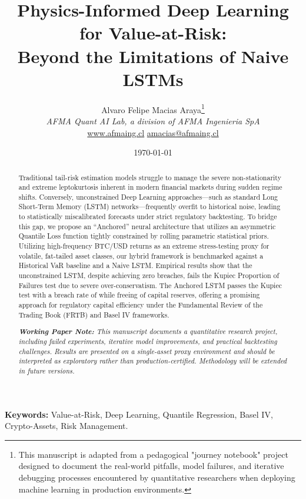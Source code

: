 \documentclass[12pt, a4paper]{article}
\title{\textbf{Physics-Informed Deep Learning for Value-at-Risk:\\ Beyond the Limitations of Naive LSTMs}}
\author{
    Alvaro Felipe Macias Araya\thanks{This manuscript is adapted from a pedagogical "journey notebook" project designed to document the real-world pitfalls, model failures, and iterative debugging processes encountered by quantitative researchers when deploying machine learning in production environments.} \\
    \textit{AFMA Quant AI Lab, a division of AFMA Ingenieria SpA} \\
    \href{https://www.afmaing.cl}{www.afmaing.cl} \quad \textbar \quad \href{mailto:amacias@afmaing.cl}{amacias@afmaing.cl}
}
\date{\today}
\begin{document}
\maketitle

\begin{abstract}
    \noindent Traditional tail-risk estimation models struggle to manage the severe non-stationarity and extreme leptokurtosis inherent in modern financial markets during sudden regime shifts. Conversely, unconstrained Deep Learning approaches---such as standard Long Short-Term Memory (LSTM) networks---frequently overfit to historical noise, leading to statistically miscalibrated forecasts under strict regulatory backtesting. To bridge this gap, we propose an ``Anchored'' neural architecture that utilizes an asymmetric Quantile Loss function tightly constrained by rolling parametric statistical priors. Utilizing high-frequency BTC/USD returns as an extreme stress-testing proxy for volatile, fat-tailed asset classes, our hybrid framework is benchmarked against a Historical VaR baseline and a Naive LSTM. Empirical results show that the unconstrained LSTM, despite achieving zero breaches, fails the Kupiec Proportion of Failures test due to severe over-conservatism. The Anchored LSTM passes the Kupiec test with a breach rate of \PhysicsInformedBreachRate{} while freeing \capEfficiencyBps{} of capital reserves, offering a promising approach for regulatory capital efficiency under the Fundamental Review of the Trading Book (FRTB) and Basel IV frameworks.

\vspace{0.5em}
\noindent\textit{\textbf{Working Paper Note:} This manuscript documents a quantitative research project, including failed experiments, iterative model improvements, and practical backtesting challenges. Results are presented on a single-asset proxy environment and should be interpreted as exploratory rather than production-certified. Methodology will be extended in future versions.}

\end{abstract}

\vspace{1em}
\textbf{Keywords:} Value-at-Risk, Deep Learning, Quantile Regression, Basel IV, Crypto-Assets, Risk Management.

\newpage
{} %

\end{document}
